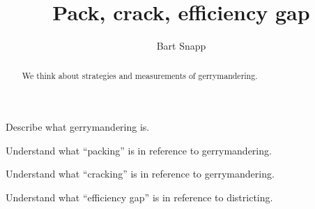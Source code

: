 \documentclass[noauthor,nooutcomes,hints,handout,12pt]{ximera}
\title{Pack, crack, efficiency gap}
\author{Bart Snapp}
\begin{document}
\begin{abstract}
  We think about strategies and measurements of gerrymandering.
\end{abstract}
\maketitle

\begin{listOutcomes}
\item Describe what gerrymandering is.
\item Understand what ``packing'' is in reference to gerrymandering.
\item Understand what ``cracking'' is in reference to gerrymandering.
\item Understand what ``efficiency gap'' is in reference to
  districting.
\end{listOutcomes}





\mynewpage
\end{document}
